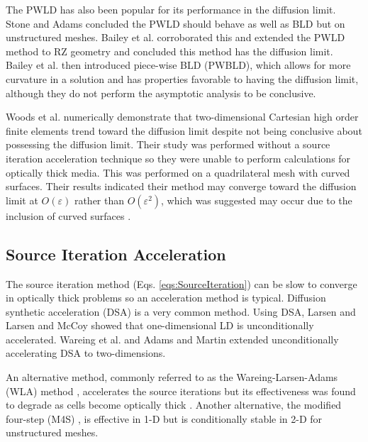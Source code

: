 \documentclass{article}
\begin{document}
The PWLD has also been popular for its performance in the diffusion limit. Stone and Adams \cite{StonePLFEM} concluded the PWLD should behave as well as BLD but on unstructured meshes. Bailey et al. \cite{BaileyDFEMCylindrical, BaileyDissertation} corroborated this and extended the PWLD method to RZ geometry and concluded this method has the diffusion limit. Bailey et al. \cite{BaileyBLDFEM} then introduced piece-wise BLD (PWBLD), which allows for more curvature in a solution and has properties favorable to having the diffusion limit, although they do not perform the asymptotic analysis to be conclusive.

Woods et al. \cite{WoodsHoDgfemXyCurved} numerically demonstrate that two-dimensional Cartesian high order finite elements trend toward the diffusion limit despite not being conclusive about possessing the diffusion limit. Their study was performed without a source iteration acceleration technique so they were unable to perform calculations for optically thick media. This was performed on a quadrilateral mesh with curved surfaces. Their results indicated their method may converge toward the diffusion limit at $O(\varepsilon)$ rather than $O(\varepsilon^2)$, which was suggested may occur due to the inclusion of curved surfaces \cite{Adams_Disc_FEM_Thick_Diff}.

\subsection{Source Iteration Acceleration}

The source iteration method (Eqs. \ref{eqs:SourceIteration}) can be slow to converge in optically thick problems so an acceleration method is typical. Diffusion synthetic acceleration (DSA) is a very common method. Using DSA, Larsen \cite{LarsenStableDSATheory} and Larsen and McCoy \cite{LarsenStableDSANumericalResults} showed that one-dimensional LD is unconditionally accelerated. Wareing et al. \cite{WareingDSADFEM} and Adams and Martin \cite{AdamsDSADFEM} extended unconditionally accelerating DSA to two-dimensions.

An alternative method, commonly referred to as the Wareing-Larsen-Adams (WLA) method \cite{WareingDSADFEM}, accelerates the source iterations but its effectiveness was found to degrade as cells become optically thick \cite{WarsaFullyConsistentLDDSA}. Another alternative, the modified four-step (M4S) \cite{AdamsFastIterativeMethods}, is effective in 1-D but is conditionally stable in 2-D for unstructured meshes.
\end{document}
